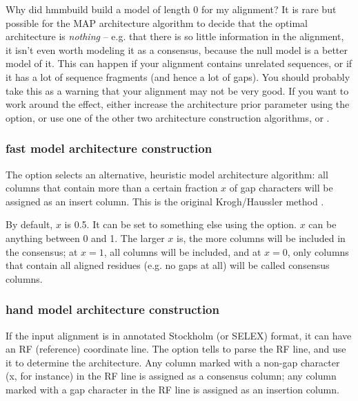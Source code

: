 \begin{srefaq}{Why did hmmbuild build a model of length 0 for my alignment?}
It is rare but possible for the MAP architecture algorithm to decide
that the optimal architecture is \emph{nothing} -- e.g. that there is
so little information in the alignment, it isn't even worth modeling
it as a consensus, because the null model is a better model of
it. This can happen if your alignment contains unrelated sequences, or
if it has a lot of sequence fragments (and hence a lot of gaps). You
should probably take this as a warning that your alignment may not be
very good. If you want to work around the effect, either increase the
architecture prior parameter using the  option, or use
one of the other two architecture construction algorithms,
 or .
\end{srefaq}

\subsubsection{fast model architecture construction}

The  option selects an alternative, heuristic model
architecture algorithm: all columns that contain more than a certain
fraction $x$ of gap characters will be assigned as an insert column.
This is the original Krogh/Haussler method \citep{Krogh94}.

By default, $x$ is 0.5. It can be set to something else using the
 option. $x$ can be anything between 0 and 1.  The
larger $x$ is, the more columns will be included in the consensus; at
$x=1$, all columns will be included, and at $x=0$, only columns that
contain all aligned residues (e.g. no gaps at all) will be called
consensus columns.

\subsubsection{hand model architecture construction}

If the input alignment is in annotated Stockholm (or SELEX) format, it
can have an RF (reference) coordinate line. The  option
tells  to parse the RF line, and use it to determine
the architecture. Any column marked with a non-gap character (x, for
instance) in the RF line is assigned as a consensus column; any column
marked with a gap character in the RF line is assigned as an insertion
column.

